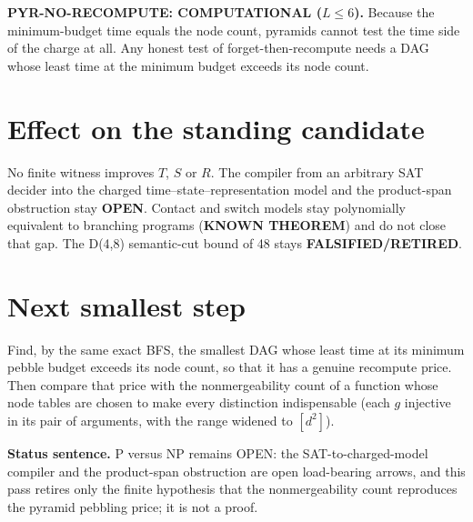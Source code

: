 \documentclass[11pt]{article}
\begin{document}
\textbf{PYR-NO-RECOMPUTE: COMPUTATIONAL ($L\le6$).} Because the minimum-budget time equals the node count, pyramids cannot test the time side of the charge at all. Any honest test of forget-then-recompute needs a DAG whose least time at the minimum budget exceeds its node count.

\section*{Effect on the standing candidate}
No finite witness improves $T$, $S$ or $R$. The compiler from an arbitrary SAT decider into the charged time--state--representation model and the product-span obstruction stay \textbf{OPEN}. Contact and switch models stay polynomially equivalent to branching programs (\textbf{KNOWN THEOREM}) and do not close that gap. The D(4,8) semantic-cut bound of 48 stays \textbf{FALSIFIED/RETIRED}.

\section*{Next smallest step}
Find, by the same exact BFS, the smallest DAG whose least time at its minimum pebble budget exceeds its node count, so that it has a genuine recompute price. Then compare that price with the nonmergeability count of a function whose node tables are chosen to make every distinction indispensable (each $g$ injective in its pair of arguments, with the range widened to $[d^2]$).

\bigskip
\noindent\textbf{Status sentence.} P versus NP remains OPEN: the SAT-to-charged-model compiler and the product-span obstruction are open load-bearing arrows, and this pass retires only the finite hypothesis that the nonmergeability count reproduces the pyramid pebbling price; it is not a proof.
\end{document}
